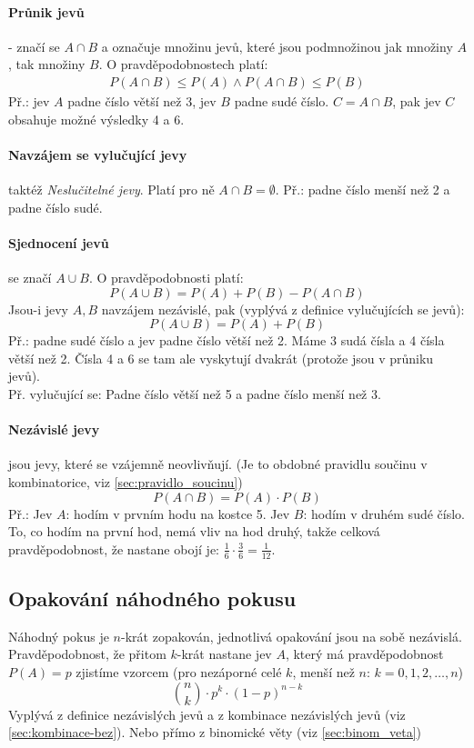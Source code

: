 \documentclass[12pt]{article}
\begin{document}
\paragraph{Průnik jevů} - značí se $A\cap B$ a označuje množinu jevů, které jsou podmnožinou jak množiny $A$, tak množiny $B$. O pravděpodobnostech platí:
\begin{align*}
P(A\cap B) \leq P(A) \land P(A\cap B) \leq P(B)
\end{align*}
Př.: jev $A$ padne číslo větší než 3, jev $B$ padne sudé číslo. $C= A \cap B$, pak jev $C$ obsahuje možné výsledky 4 a 6.
\paragraph{Navzájem se vylučující jevy} taktéž \emph{Neslučitelné jevy}. Platí pro ně $A \cap B = \emptyset$. Př.: padne číslo menší než 2 a padne číslo sudé.
\paragraph{Sjednocení jevů} se značí $A \cup B$. O pravděpodobnosti platí:
\begin{equation}
P(A \cup B) = P(A) + P(B) - P(A \cap B)
\end{equation}
Jsou-i jevy $A,B$ navzájem nezávislé, pak (vyplývá z definice vylučujících se jevů):
\begin{equation}
P(A \cup B) = P(A) + P(B)
\end{equation}
Př.: padne sudé číslo a jev padne číslo větší než 2.  Máme 3 sudá čísla a 4 čísla větší než 2. Čísla 4 a 6 se tam  ale vyskytují dvakrát (protože jsou v průniku jevů).\\
Př. vylučující se: Padne číslo větší než 5 a padne číslo menší než 3.
\paragraph{Nezávislé jevy} jsou jevy, které se vzájemně neovlivňují. (Je to obdobné pravidlu součinu v kombinatorice, viz \ref{sec:pravidlo_soucinu})
\begin{equation}
P(A \cap B) = P(A) \cdot P(B)
\end{equation}
Př.: Jev $A$: hodím v prvním hodu na kostce 5. Jev $B$: hodím v druhém sudé číslo. To, co hodím na první hod, nemá vliv na hod druhý, takže celková pravděpodobnost, že nastane obojí je: $\frac{1}{6} \cdot \frac{3}{6} = \frac{1}{12}$. 
\subsection{Opakování náhodného pokusu}
Náhodný pokus je $n$-krát zopakován, jednotlivá opakování jsou na sobě nezávislá. Pravděpodobnost, že přitom $k$-krát nastane jev $A$, který má pravděpodobnost $P(A) =p$ zjistíme vzorcem (pro nezáporné celé $k$, menší než $n$:  $k =0,1,2, \dotsc, n$)
\begin{equation}
\label{eq:binom_rozdeleni}
\binom{n}{k} \cdot p^k \cdot \left( 1-p \right)^{n-k}
\end{equation}
Vyplývá z definice nezávislých jevů a z kombinace nezávislých jevů (viz \ref{sec:kombinace-bez}). Nebo přímo z binomické věty (viz \ref{sec:binom_veta})
\end{document}
